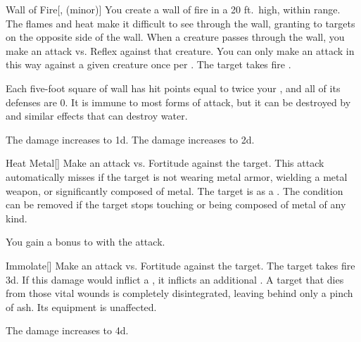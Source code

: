 \lowercase{\hypertarget{spell:Wall of Fire}{}}\label{spell:Wall of Fire}
\begin{freeability}[Rank 4]{\hypertarget{spell:Wall of Fire}{Wall of Fire}}[,  (minor)]
You create a wall of fire in a 20 ft.\ high, \arealarge {} within \rngmed range.
The flames and heat make it difficult to see through the wall, granting  to targets on the opposite side of the wall.
When a creature passes through the wall, you make an attack vs. Reflex against that creature.
You can only make an attack in this way against a given creature once per .
\hit The target takes fire .

Each five-foot square of wall has hit points equal to twice your , and all of its defenses are 0.
It is immune to most forms of attack, but it can be destroyed by  and similar effects that can destroy water.

\rankline
{} The damage increases to  \plus1d.
 The damage increases to  \plus2d.
\end{freeability}
\vspace{0.25em}



\lowercase{\hypertarget{spell:Heat Metal}{}}\label{spell:Heat Metal}
\begin{freeability}[Rank 5]{\hypertarget{spell:Heat Metal}{Heat Metal}}[]
Make an attack vs. Fortitude against the target.
This attack automatically misses if the target is not wearing metal armor, wielding a metal weapon, or significantly composed of metal.
\hit The target is  as a .
The condition can be removed if the target stops touching or being composed of metal of any kind.

\rankline
{} You gain a  bonus to  with the attack.
\end{freeability}
\vspace{0.25em}



\lowercase{\hypertarget{spell:Immolate}{}}\label{spell:Immolate}
\begin{freeability}[Rank 5]{\hypertarget{spell:Immolate}{Immolate}}[]
Make an attack vs. Fortitude against the target.
\hit The target takes fire  \plus3d.
If this damage would inflict a , it inflicts an additional .
A target that dies from those vital wounds is completely disintegrated, leaving behind only a pinch of ash.
Its equipment is unaffected.

\rankline
{} The damage increases to  \plus4d.
\end{freeability}
\vspace{0.25em}



